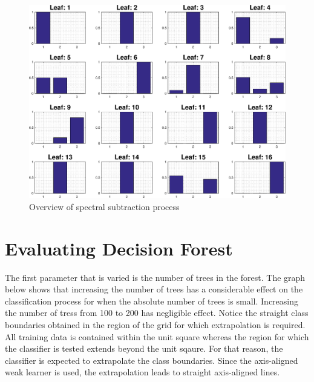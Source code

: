 \documentclass[a4paper,pra,twocolumn,10pt,aps,longbibliography,nobalancelastpage]{revtex4-1}
\begin{document}
\begin{figure}[H]
	\centering
    \includegraphics[width=0.60\columnwidth]{leaf_node_distributions_1}
    \caption{Overview of spectral subtraction process}
    \label{fig:leaf_nodes}
\end{figure}

\section{Evaluating Decision Forest}

The first parameter that is varied is the number of trees in the forest. The graph below shows that increasing the number of trees has a considerable effect on the classification process for when the absolute number of trees is small. Increasing the number of tress from 100 to 200 has negligible effect. Notice the straight class boundaries obtained in the region of the grid for which extrapolation is required. All training data is contained within the unit square whereas the region for which the classifier is tested extends beyond the unit sqaure. For that reason, the classifier is expected to extrapolate the class boundaries. Since the axis-aligned weak learner is used, the extrapolation leads to straight axis-aligned lines. 
\end{document}
